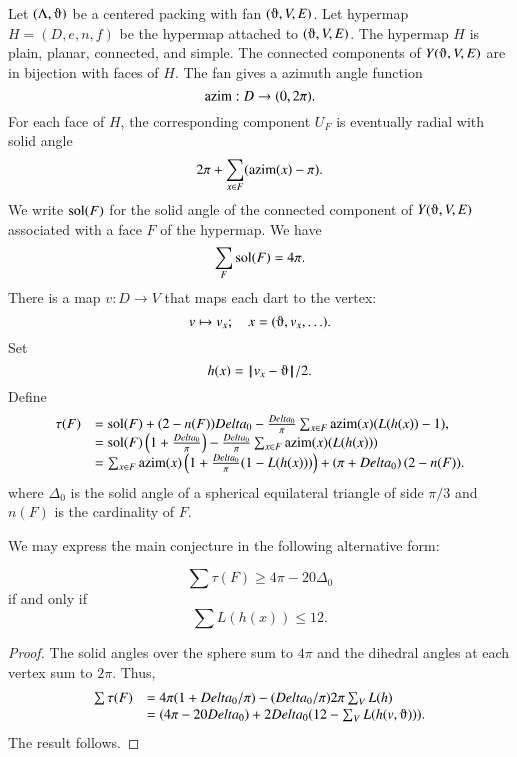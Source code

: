 Let $(\Lambda,\orgn)$ be a centered packing with
fan $(\orgn,V,E)$.  Let  hypermap $H=(D,e,n,f)$
be the hypermap attached to $(\orgn,V,E)$.
The hypermap $H$ is plain, planar, connected, and simple.
The connected components of $Y(\orgn,V,E)$ are in bijection with
faces of $H$.  
The fan gives a azimuth angle function
$$
{\operatorname{azim}} : D \to (0,2\pi).
$$
For each face of $H$, the corresponding component $U_F$
is eventually radial with solid
angle
  $$
  2\pi + \sum_{x\in F} ({\operatorname{azim}}(x) -\pi).
  $$
We write $\operatorname{sol}(F)$ for the solid angle of the connected component
of $Y(\orgn,V,E)$ associated with a face $F$ of the hypermap.
We have
    $$\sum_{F} \operatorname{sol}(F) = 4\pi.$$
There is a map $v:D\to V$ that maps each dart to the vertex:
$$
v \mapsto v_x; \quad   x = (\orgn,v_x,\ldots).
$$
Set 
$$h(x) = \norm{v_x}{\orgn}/2.$$
Define
\begin{equation}
\begin{array}{lll}
\tau(F) &= \operatorname{sol}(F) + (2- n(F))Delta_0 - \frac{Delta_0}{\pi}\sum_{x\in F}{\operatorname{azim}}(x) (L(h(x)) - 1),\\
  &= \operatorname{sol}(F) \left( 1 + \frac{Delta_0}{\pi}\right) - \frac{Delta_0}{\pi} \sum_{x\in F} {\operatorname{azim}}(x)(L(h(x)))\\
  &=\sum_{x\in F} {\operatorname{azim}}(x)\left(1 + \frac{Delta_0}{\pi}(1- L(h(x)))\right) + \left(\pi+{Delta_0}\right) (2- n(F)).
\end{array}
\end{equation}
where $\Delta_0$ is the solid angle of a spherical equilateral triangle of side $\pi/3$ and $n(F)$ is the cardinality of $F$.

We may express the main conjecture in the following alternative form:

\begin{lemma}
$$
\sum \tau (F) \ge 4\pi - 20\Delta_0
$$
if and only if
$$
\sum L(h(x)) \le 12.
$$
\end{lemma}

\begin{proof}
The solid angles over the sphere sum to $4\pi$ and the dihedral angles at each vertex sum to $2\pi$. 
Thus,
\begin{equation}\label{eqn:delta0}
\begin{array}{lll}
\sum \tau (F) 
&= 4\pi (1 + \Delta_0/\pi) - (\Delta_0/\pi) 2\pi \sum_{V} L(h)\\

&= (4\pi - 20\Delta_0) + 2\Delta_0 (12 - \sum_V L(h(v,\orgn))).
\end{array}
\end{equation}
The result follows.
\end{proof}

